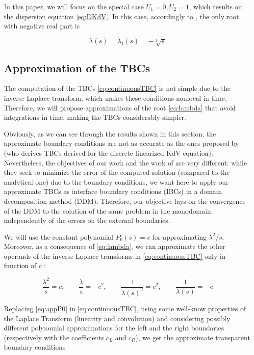 \indent In this paper, we will focus on the special case $U_1 = 0, U_2 = 1$, which results on the dispersion equation \eqref{eq:DKdV}. In this case, accordingly to \cite{zheng2008}, the only root with negative real part is 

\begin{equation}
	\label{eq:lambda}
			\lambda(s) = \lambda_1(s) =  -\sqrt[3]{s} 
\end{equation}

\subsection{Approximation of the TBCs}

\indent The computation of the TBCs \eqref{eq:continuousTBC} is not simple due to the inverse Laplace transform, which makes these conditions nonlocal in time. Therefore, we will propose approximations of the root \eqref{eq:lambda} that avoid integrations in time, making the TBCs considerably simpler.

\indent Obviously, as we can see through the results shown in this section, the approximate boundary conditions are not as accurate as the ones proposed by \cite{besse2015} (who derives TBCs derived for the discrete linearized KdV equation). Nevertheless, the objectives of our work and the work of \cite{besse2015} are very different: while they seek to minimize the error of the computed solution (compared to the analytical one) due to the boundary conditions, we want here to apply our approximate TBCs as interface boundary conditions (IBCs) in a domain decomposition method (DDM). Therefore, our objective lays on the convergence of the DDM to the solution of the same problem in the monodomain, independently of the errors on the external boundaries. 

\indent We will use the constant polynomial $P_0(s) = c$ for approximating $\lambda^2/s$. Moreover, as a consequence of \eqref{eq:lambda}, we can approximate the other operands of the inverse Laplace transforms in \eqref{eq:continuousTBC} only in function of $c$ :

\begin{equation}
	\label{eq:appP0}
	\frac{\lambda^2}{s}  = c, \qquad
	\frac{\lambda}{s}  = -c^2, \qquad
	\frac{1}{\lambda(s)^2}  = c^2, \qquad 
	 \frac{1}{\lambda(s)}  = -c 
\end{equation}

\indent Replacing \eqref{eq:appP0} in \eqref{eq:continuousTBC}, using some well-know properties of the Laplace Transform (linearity and convolution) and considering possibly different polynomial approximations for the left and the right boundaries (respectively with the coefficients $c_L$ and $c_R$), we get the approximate transparent boundary conditions

